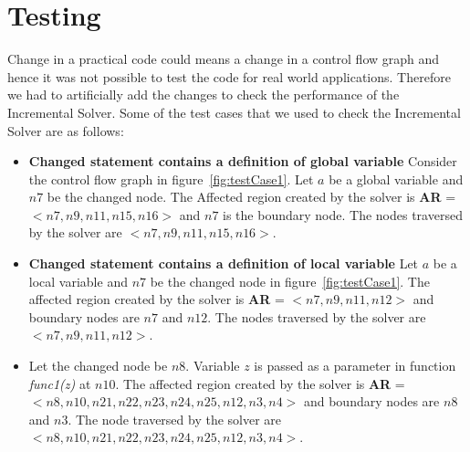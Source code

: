 \documentclass[11pt,a4paper,openright]{report}
\begin{document}


\section{Testing}
Change in a practical code could means a change in a control flow graph and hence it was not possible to test the code for real world applications.
Therefore we had to artificially add the changes to check the performance of the Incremental Solver.
Some of the test cases that we used to check the Incremental Solver are as follows:
\begin{itemize}
 \item \textbf{Changed statement contains a definition of global variable} Consider the control flow graph in figure~\ref{fig:testCase1}. Let $a$ be a global variable
 and $n7$ be the changed node. The Affected region created by the solver is \textbf{AR} = $< n7, n9, n11, n15, n16 >$ and $n7$ is the boundary node.
 The nodes traversed by the solver are $<  n7, n9, n11, n15, n16 >$.
 \item \textbf{Changed statement contains a definition of local variable} Let $a$ be a local variable and $n7$ be the changed node in figure~\ref{fig:testCase1}.
 The affected region created by the solver is \textbf{AR} = $< n7, n9, n11, n12 >$ and boundary nodes are $n7$ and $n12$.
 The nodes traversed by the solver are $<  n7, n9, n11, n12 >$.
 \item Let the changed node be $n8$. Variable $z$ is passed as a parameter in function \textit{func1(z)} at $n10$. The affected region created by the solver is 
 \textbf{AR} = $< n8, n10, n21, n22, n23, n24, n25, n12, n3, n4 >$ and boundary nodes are $n8$ and $n3$. The node traversed by the solver are $< n8, n10, n21, n22, n23, n24, n25, n12, n3, n4 >$.
\end{itemize}
\end{document}
